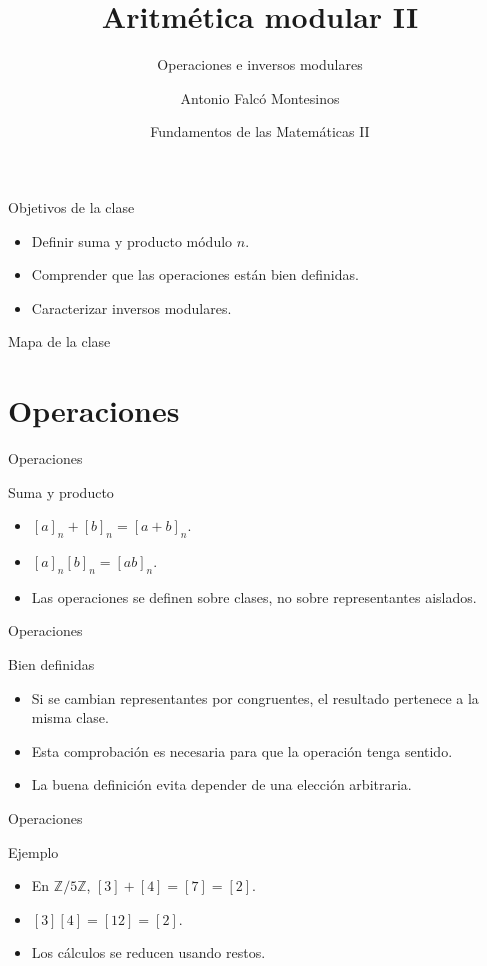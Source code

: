 \documentclass[aspectratio=169,11pt]{beamer}
\title[FdM II -- Clase 10]{Aritmética modular II}
\subtitle{Operaciones e inversos modulares}
\author{Antonio Falcó Montesinos}
\institute{Universidad CEU Cardenal Herrera}
\date{Fundamentos de las Matemáticas II}
\begin{document}
\begin{frame}
  \titlepage
\end{frame}

\begin{frame}{Objetivos de la clase}
\begin{itemize}
  \item Definir suma y producto módulo \(n\).
  \item Comprender que las operaciones están bien definidas.
  \item Caracterizar inversos modulares.
\end{itemize}
\end{frame}

\begin{frame}{Mapa de la clase}
\tableofcontents
\end{frame}

\section{Operaciones}

\begin{frame}{Operaciones}
\begin{block}{Suma y producto}
\begin{itemize}
  \item \([a]_n+[b]_n=[a+b]_n\).
  \item \([a]_n[b]_n=[ab]_n\).
  \item Las operaciones se definen sobre clases, no sobre representantes aislados.
\end{itemize}
\end{block}
\end{frame}

\begin{frame}{Operaciones}
\begin{block}{Bien definidas}
\begin{itemize}
  \item Si se cambian representantes por congruentes, el resultado pertenece a la misma clase.
  \item Esta comprobación es necesaria para que la operación tenga sentido.
  \item La buena definición evita depender de una elección arbitraria.
\end{itemize}
\end{block}
\end{frame}

\begin{frame}{Operaciones}
\begin{block}{Ejemplo}
\begin{itemize}
  \item En \(\mathbb{Z}/5\mathbb{Z}\), \([3]+[4]=[7]=[2]\).
  \item \([3][4]=[12]=[2]\).
  \item Los cálculos se reducen usando restos.
\end{itemize}
\end{block}
\end{frame}
\end{document}
